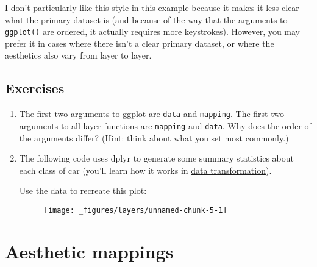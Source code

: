 I don't particularly like this style in this example because it makes it
less clear what the primary dataset is (and because of the way that the
arguments to \texttt{ggplot()} are ordered, it actually requires more
keystrokes). However, you may prefer it in cases where there isn't a
clear primary dataset, or where the aesthetics also vary from layer to
layer.

\hypertarget{exercises}{%
\subsection{Exercises}\label{exercises}}

\begin{enumerate}
\def\labelenumi{\arabic{enumi}.}
\item
  The first two arguments to ggplot are \texttt{data} and
  \texttt{mapping}. The first two arguments to all layer functions are
  \texttt{mapping} and \texttt{data}. Why does the order of the
  arguments differ? (Hint: think about what you set most commonly.)
\item
  The following code uses dplyr to generate some summary statistics
  about each class of car (you'll learn how it works in
  \protect\hyperlink{cha:dplyr}{data transformation}).

\begin{Shaded}
\end{Shaded}

  Use the data to recreate this plot:

  \begin{figure}[H]
    \centering
    \texttt{[image: \_figures/layers/unnamed-chunk-5-1]}
  \end{figure}
\end{enumerate}

\hypertarget{sec:aes}{%
\section{Aesthetic mappings}\label{sec:aes}}

